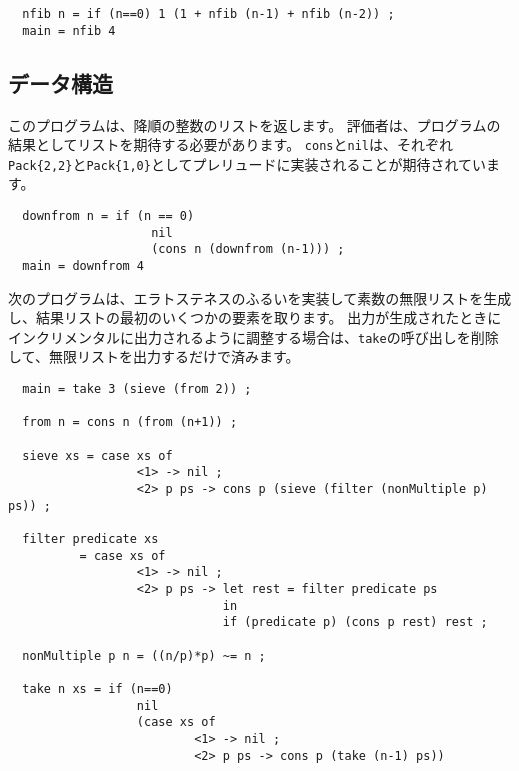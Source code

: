 \documentclass{jarticle}
\begin{document}
\begin{verbatim}
  nfib n = if (n==0) 1 (1 + nfib (n-1) + nfib (n-2)) ;
  main = nfib 4
\end{verbatim}

\subsection{データ構造}

このプログラムは、降順の整数のリストを返します。
評価者は、プログラムの結果としてリストを期待する必要があります。
\texttt{cons}と\texttt{nil}は、それぞれ\texttt{Pack\{2,2\}}と\texttt{Pack\{1,0\}}としてプレリュードに実装されることが期待されています。

\begin{verbatim}
  downfrom n = if (n == 0)
                    nil
                    (cons n (downfrom (n-1))) ;
  main = downfrom 4
\end{verbatim}

次のプログラムは、エラトステネスのふるいを実装して素数の無限リストを生成し、結果リストの最初のいくつかの要素を取ります。
出力が生成されたときにインクリメンタルに出力されるように調整する場合は、\texttt{take}の呼び出しを削除して、無限リストを出力するだけで済みます。

\begin{verbatim}
  main = take 3 (sieve (from 2)) ;

  from n = cons n (from (n+1)) ;

  sieve xs = case xs of
                  <1> -> nil ;
                  <2> p ps -> cons p (sieve (filter (nonMultiple p) ps)) ;

  filter predicate xs
          = case xs of
                  <1> -> nil ;
                  <2> p ps -> let rest = filter predicate ps
                              in
                              if (predicate p) (cons p rest) rest ;

  nonMultiple p n = ((n/p)*p) ~= n ;

  take n xs = if (n==0)
                  nil
                  (case xs of
                          <1> -> nil ;
                          <2> p ps -> cons p (take (n-1) ps))
\end{verbatim}
\end{document}
